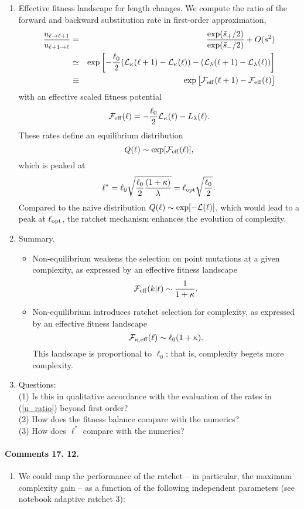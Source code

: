 \documentclass[10pt,a4paper]{article}
\renewcommand{\L}{{\cal L}}
\newcommand{\F}{{\cal F}}
\newcommand{\EQ}{\begin{equation}}
\newcommand{\EE}{\end{equation}}
\newcommand{\EQA}{\begin{eqnarray}}
\newcommand{\EEA}{\end{eqnarray}}
\begin{document}
{\begin{enumerate}
\item Effective fitness landscape for length changes. We compute the ratio of the forward and backward substitution rate in first-order approximation,
\EQA
\frac{u_{\ell \to \ell+1}}{u_{\ell + 1 \to \ell}} & = & \frac{\exp(\bar s_+/2)}{\exp(\bar s_-/2)} +O(s^2)
\\
& \simeq & \exp \left [ - \frac{\ell_0}{2} (\L_\kappa (\ell+1) - \L_\kappa (\ell)) - (\L_\lambda (\ell+1) - \L_\lambda (\ell)) \right ]
\\
& \equiv & \exp \big [ \F_{\rm eff} (\ell+1) - \F_{\rm eff} (\ell) \big ]
\label{u_ratio}
\EEA
with an effective scaled fitness potential
\EQ
\F_{\rm eff} (\ell) = - \frac{\ell_0}{2} \L_\kappa (\ell) - L_\lambda (\ell) .
 \EE
These rates define an equilibrium distribution
\EQ
Q(\ell) \sim \exp [ \F_{\rm eff} (\ell)],
\EE
which is peaked at
\EQ
\ell^* = \ell_0 \sqrt{ \frac{\ell_0}{2} \frac{(1+\kappa)}{\lambda}} = \ell_{\rm opt} \sqrt{ \frac{\ell_0}{2}} .
\EE
Compared to the naive distribution $Q(\ell) \sim \exp [ - \L (\ell)]$, which would lead to a peak at $\ell_{\rm opt}$, the ratchet mechanism enhances the evolution of complexity.

\item Summary.
\begin{itemize}
\item Non-equilibrium weakens the selection on point mutations at a given complexity, as expressed by an effective fitness landscape
\EQ
\F_{\rm eff} (k|\ell) \sim \frac{1}{1 + \kappa} .
\EE
\item Non-equilibrium introduces ratchet selection for complexity, as expressed by an effective fitness landscape
\EQ
\F_{\kappa, \rm eff} (\ell) \sim \ell_0(1+ \kappa).
\EE
This landscape is proportional to $\ell_0$; that is, complexity begets more complexity.
\end{itemize}

\item Questions:\\
(1) Is this in qualitative accordance with the evaluation of the rates in (\ref{u_ratio}) beyond first order?
\\
(2) How does the fitness balance compare with the numerics?
\\
(3) How does $\ell^*$ compare with the numerics?
\end{enumerate}


\paragraph{Comments 17. 12.}
\begin{enumerate}
\item We could map the performance of the ratchet -- in particular, the maximum complexity gain -- as a function of the following independent parameters (see notebook adaptive ratchet 3): 


\end{enumerate}}
\end{document}
